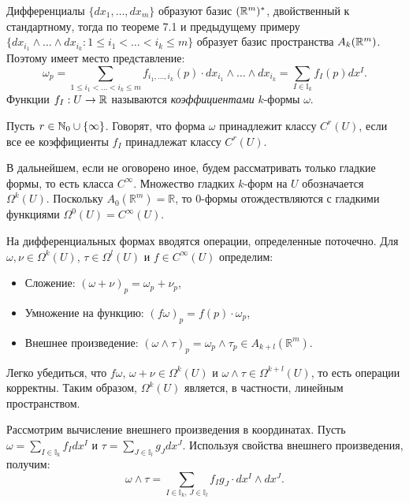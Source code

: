 \begin{note}
	Дифференциалы $\{dx_1, \dotsc, dx_m\}$ образуют базис $(\mathbb{R}^m)^*$, двойственный к стандартному, 
	тогда по теореме 7.1 и предыдущему примеру $\{dx_{i_1} \wedge \dotsc \wedge dx_{i_k} : 1 \leq i_1 < \dotsc < i_k \leq m\}$ образует базис пространства $A_k(\mathbb{R}^m)$.
	Поэтому имеет место представление:
	\[ \omega_p = \sum \limits_{1 \leq i_1 < \dotsc < i_k \leq m} f_{i_1, \dotsc, i_k}(p) \cdot dx_{i_1} \wedge \dotsc \wedge dx_{i_k} = \sum \limits_{I \in \mathbb{I}_k} f_I(p) dx^I. \]
	Функции $f_I : U \to \mathbb{R}$ называются \textit{коэффициентами} $k$-формы $\omega$.
\end{note}

\begin{definition}
	Пусть $r \in \mathbb{N}_0 \cup \{\infty\}$. Говорят, что форма $\omega$ принадлежит классу $C^r(U)$, если все ее коэффициенты $f_I$ принадлежат классу $C^r(U)$.
\end{definition}

В дальнейшем, если не оговорено иное, будем рассматривать только гладкие формы, то есть класса $C^\infty$. 
Множество гладких $k$-форм на $U$ обозначается $\Omega^k(U)$.
Поскольку $A_0(\mathbb{R}^m) = \mathbb{R}$, то $0$-формы отождествляются с гладкими функциями $\Omega^0(U) = C^{\infty}(U)$.

\begin{note}
	На дифференциальных формах вводятся операции, определенные поточечно. 
	Для $\omega, \nu \in \Omega^k(U)$, $\tau \in \Omega^l(U)$ и $f \in C^\infty(U)$ определим:
	\begin{itemize}[itemsep = 0pt, topsep = 5pt]
		\item Сложение: $(\omega + \nu)_p = \omega_p + \nu_p$,
		\item Умножение на функцию: $(f \omega)_p = f(p) \cdot \omega_p$,
		\item Внешнее произведение: $(\omega \wedge \tau)_p = \omega_p \wedge \tau_p \in A_{k+l}(\mathbb{R}^m)$.
	\end{itemize} 
	Легко убедиться, что $f \omega, \, \omega + \nu \in \Omega^k(U)$ и $\omega \wedge \tau \in \Omega^{k+l}(U)$, то есть операции корректны. Таким образом, $\Omega^k(U)$ является, в частности, линейным пространством.
\end{note}

\begin{example}
	Рассмотрим вычисление внешнего произведения в координатах.
	Пусть $\omega = \sum_{I \in \mathbb{I}_k} f_I dx^I$ и $\tau = \sum_{J \in \mathbb{I}_l} g_J dx^J$.
	Используя свойства внешнего произведения, получим:
	\[ \omega \wedge \tau = \sum_{I \in \mathbb{I}_k, \, J \in \mathbb{I}_l} f_I g_J \cdot dx^I \wedge dx^J. \]
\end{example}


